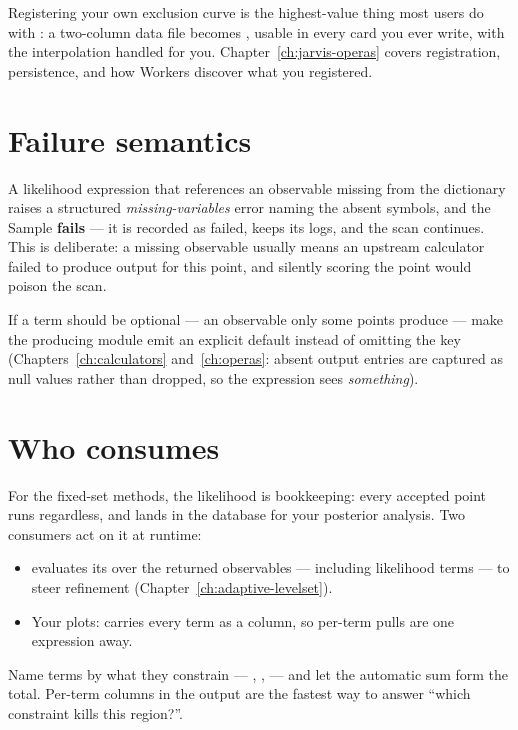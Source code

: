 \begin{jtip}
Registering your own exclusion curve is the highest-value thing most users do with
\Operas: a two-column data file becomes , usable in every
card you ever write, with the interpolation handled for you.
Chapter~\ref{ch:jarvis-operas} covers registration, persistence, and how Workers
discover what you registered.
\end{jtip}

\section{Failure semantics}
\label{sec:likelihood-failure}

A likelihood expression that references an observable missing from the dictionary raises
a structured \emph{missing-variables} error naming the absent symbols, and the Sample
\textbf{fails} --- it is recorded as failed, keeps its logs, and the scan continues.
This is deliberate: a missing observable usually means an upstream calculator failed to
produce output for this point, and silently scoring the point would poison the scan.

If a term should be optional --- an observable only some points produce --- make the
producing module emit an explicit default instead of omitting the key
(Chapters~\ref{ch:calculators} and~\ref{ch:operas}: absent output entries are captured
as null values rather than dropped, so the expression sees \emph{something}).

\section{Who consumes }
\label{sec:logl-consumers}

For the fixed-set methods, the likelihood is bookkeeping: every accepted point runs
regardless, and  lands in the database for your posterior analysis. Two
consumers act on it at runtime:

\begin{itemize}
  \item {} evaluates its  over the
        returned observables --- including likelihood terms --- to steer refinement
        (Chapter~\ref{ch:adaptive-levelset}).
  \item Your plots:  carries every term as a column, so per-term
        pulls are one  expression away.
\end{itemize}

\begin{jtip}
Name terms by what they constrain --- , ,
 --- and let the automatic sum form the total. Per-term columns in the
output are the fastest way to answer ``which constraint kills this region?''.
\end{jtip}
